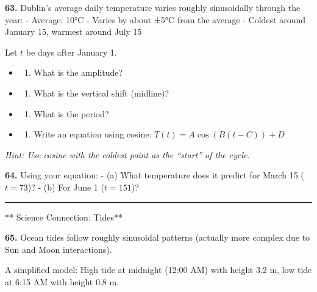 \documentclass[
  11pt,
]{article}
\providecommand{\tightlist}{%
  \setlength{\itemsep}{0pt}\setlength{\parskip}{0pt}}
\begin{document}
\textbf{63.} Dublin's average daily temperature varies roughly
sinusoidally through the year: - Average: 10°C - Varies by about ±5°C
from the average - Coldest around January 15, warmest around July 15

Let \(t\) be days after January 1.

\begin{itemize}
\item
  \begin{enumerate}
  \def\labelenumi{(\alph{enumi})}
  \tightlist
  \item
    What is the amplitude?
  \end{enumerate}
\item
  \begin{enumerate}
  \def\labelenumi{(\alph{enumi})}
  \setcounter{enumi}{1}
  \tightlist
  \item
    What is the vertical shift (midline)?
  \end{enumerate}
\item
  \begin{enumerate}
  \def\labelenumi{(\alph{enumi})}
  \setcounter{enumi}{2}
  \tightlist
  \item
    What is the period?
  \end{enumerate}
\item
  \begin{enumerate}
  \def\labelenumi{(\alph{enumi})}
  \setcounter{enumi}{3}
  \tightlist
  \item
    Write an equation using cosine: \(T(t) = A\cos(B(t - C)) + D\)
  \end{enumerate}
\end{itemize}

\emph{Hint: Use cosine with the coldest point as the ``start'' of the
cycle.}

\textbf{64.} Using your equation: - (a) What temperature does it predict
for March 15 (\(t = 73\))? - (b) For June 1 (\(t = 151\))?

\begin{center}\rule{0.5\linewidth}{0.5pt}\end{center}

** Science Connection: Tides**

\textbf{65.} Ocean tides follow roughly sinusoidal patterns (actually
more complex due to Sun and Moon interactions).

A simplified model: High tide at midnight (12:00 AM) with height 3.2 m,
low tide at 6:15 AM with height 0.8 m.
\end{document}
